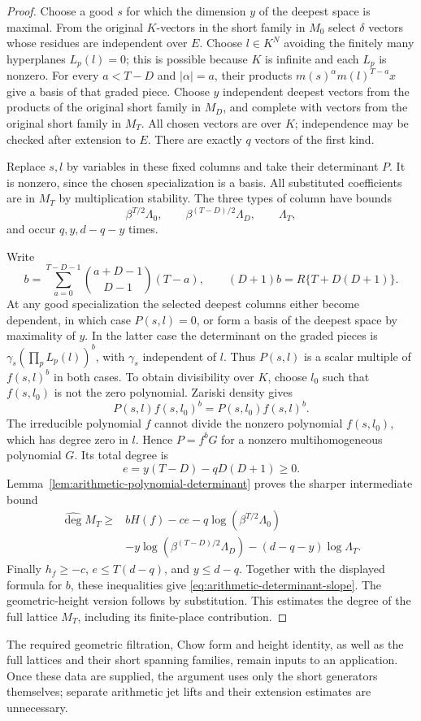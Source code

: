 \begin{proof}
Choose a good $s$ for which the dimension $y$ of the deepest space is
maximal.  From the original $K$-vectors in the short family in $M_0$
select $\delta$ vectors whose residues are independent over $E$.
Choose $l\in K^N$ avoiding the finitely many hyperplanes $L_p(l)=0$;
this is possible because $K$ is infinite and each $L_p$ is nonzero.
For every $a<T-D$ and $|\alpha|=a$, their products
$m(s)^\alpha m(l)^{T-a}x$ give a basis of that graded piece.
Choose $y$ independent deepest vectors from the products of the original
short family in $M_D$, and complete with vectors from the original
short family in $M_T$.  All chosen vectors are over $K$; independence
may be checked after extension to $E$.  There are exactly $q$ vectors
of the first kind.

Replace $s,l$ by variables in these fixed columns and take their
determinant $P$.  It is nonzero, since the chosen specialization is a
basis.  All substituted coefficients are in $M_T$ by multiplication
stability.  The three types of column have bounds
\[
       \beta^{T/2}\Lambda_0,\qquad
       \beta^{(T-D)/2}\Lambda_D,\qquad\Lambda_T,
\]
and occur $q,y,d-q-y$ times.

Write
\[
 b=\sum_{a=0}^{T-D-1}\binom{a+D-1}{D-1}(T-a),\qquad
                 (D+1)b=R\{T+D(D+1)\}.
\]
At any good specialization the selected deepest columns either become
dependent, in which case $P(s,l)=0$, or form a basis of the deepest
space by maximality of $y$.  In the latter case the determinant on the
graded pieces is
$\gamma_s(\prod_pL_p(l))^b$, with $\gamma_s$ independent of $l$.
Thus $P(s,l)$ is a scalar multiple of $f(s,l)^b$ in both cases.
To obtain divisibility over $K$, choose $l_0$ such that
$f(s,l_0)$ is not the zero polynomial.  Zariski density gives
\[
       P(s,l)f(s,l_0)^b=P(s,l_0)f(s,l)^b.
\]
The irreducible polynomial $f$ cannot divide the nonzero polynomial
$f(s,l_0)$, which has degree zero in $l$.  Hence $P=f^bG$ for a
nonzero multihomogeneous polynomial $G$.  Its total degree is
\[
           e=y(T-D)-qD(D+1)\geq0.
\]
Lemma~\ref{lem:arithmetic-polynomial-determinant} proves the sharper
intermediate bound
\begin{equation}\label{eq:arithmetic-determinant-exact}
 \begin{split}
 \widehat{\deg}M_T\geq{}&bH(f)-ce-q\log(\beta^{T/2}\Lambda_0)\\
 &-y\log(\beta^{(T-D)/2}\Lambda_D)
   -(d-q-y)\log\Lambda_T.
 \end{split}
\end{equation}
Finally $h_f\geq-c$, $e\leq T(d-q)$, and $y\leq d-q$.
Together with the displayed formula for $b$, these inequalities give
\eqref{eq:arithmetic-determinant-slope}.  The geometric-height version
follows by substitution.  This estimates the degree of the full
lattice $M_T$, including its finite-place contribution.
\end{proof}

The required geometric filtration, Chow form and height identity, as
well as the full lattices and their short spanning families, remain
inputs to an application.  Once these data are supplied, the argument
uses only the short generators themselves; separate arithmetic jet
lifts and their extension estimates are unnecessary.
